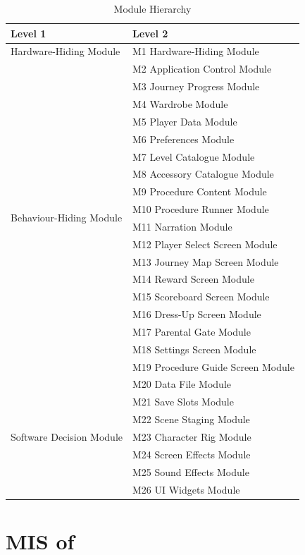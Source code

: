 \documentclass[10pt, titlepage]{article}
\begin{document}
\begin{table}[H]
\caption{Module Hierarchy}
\label{TblMH}
\renewcommand{\arraystretch}{1.3}
\begin{tabularx}{\textwidth}{@{}p{}X@{}}
\toprule
\textbf{Level 1} & \textbf{Level 2} \\
\midrule
Hardware-Hiding Module & M1 Hardware-Hiding Module \\
\midrule
\multirow{18}{0.31\textwidth}{Behaviour-Hiding Module}
& M2 Application Control Module \\
& M3 Journey Progress Module \\
& M4 Wardrobe Module \\
& M5 Player Data Module \\
& M6 Preferences Module \\
& M7 Level Catalogue Module \\
& M8 Accessory Catalogue Module \\
& M9 Procedure Content Module \\
& M10 Procedure Runner Module \\
& M11 Narration Module \\
& M12 Player Select Screen Module \\
& M13 Journey Map Screen Module \\
& M14 Reward Screen Module \\
& M15 Scoreboard Screen Module \\
& M16 Dress-Up Screen Module \\
& M17 Parental Gate Module \\
& M18 Settings Screen Module \\
& M19 Procedure Guide Screen Module \\
\midrule
\multirow{7}{0.31\textwidth}{Software Decision Module}
& M20 Data File Module \\
& M21 Save Slots Module \\
& M22 Scene Staging Module \\
& M23 Character Rig Module \\
& M24 Screen Effects Module \\
& M25 Sound Effects Module \\
& M26 UI Widgets Module \\
\bottomrule
\end{tabularx}
\end{table}

\newpage
\section{MIS of } \label{Module} 
\end{document}
